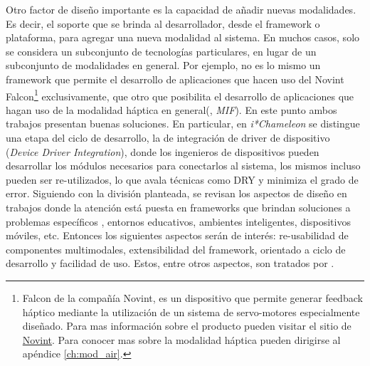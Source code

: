 Otro factor de diseño importante es la capacidad de añadir nuevas modalidades. Es decir, el soporte que se brinda al desarrollador, desde el framework o plataforma, para agregar una nueva modalidad al sistema. En muchos casos, solo se considera un subconjunto de tecnologías particulares, en lugar de un subconjunto de modalidades en general. Por ejemplo, no es lo mismo un framework que permite el desarrollo de aplicaciones que hacen uso del \textsf{Novint Falcon}\footnote{Falcon de la compañía Novint, es un dispositivo que permite generar feedback háptico mediante la utilización de un sistema de servo-motores especialmente diseñado. Para mas información sobre el producto pueden visitar el sitio de  \href{http://www.novint.com/index.php/novintfalcon}{Novint}. Para conocer mas sobre la modalidad háptica pueden dirigirse al apéndice \ref{ch:mod_air}.} exclusivamente, que otro que posibilita el desarrollo de aplicaciones que hagan uso de la modalidad háptica en general(\eg, \emph{MIF}). En este punto ambos trabajos presentan buenas soluciones. En particular, en \emph{i*Chameleon} se distingue una etapa del ciclo de desarrollo, la de integración de driver de dispositivo (\emph{Device Driver Integration}), donde los ingenieros de dispositivos pueden desarrollar los módulos necesarios para conectarlos al sistema, los mismos incluso pueden ser re-utilizados, lo que avala técnicas como DRY y minimiza el grado de error.
\linebreak
Siguiendo con la división planteada, se revisan los aspectos de diseño en trabajos donde la atención está puesta en frameworks que brindan soluciones a problemas específicos  \ie, entornos educativos, ambientes inteligentes, dispositivos móviles, etc.
Entonces los siguientes aspectos serán de interés: re-usabilidad de componentes multimodales, extensibilidad del framework, orientado a ciclo de desarrollo y facilidad de uso. Estos, entre otros aspectos, son tratados por \citet{dumas2009multimodal}.

